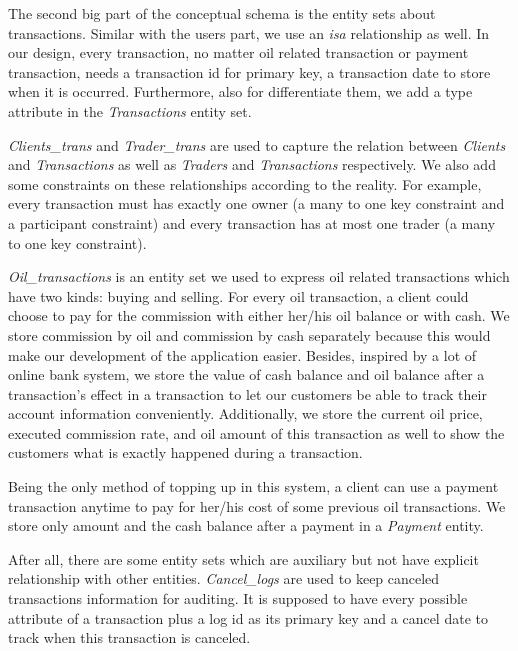 \documentclass[12pt,a4paper]{report}
\begin{document}
\begin{mypara}
  The second big part of the conceptual schema is the entity sets about transactions. Similar with the users part, we use an \textit{isa} relationship as well. In our design, every transaction, no matter oil related transaction or payment transaction, needs a transaction id for primary key, a transaction date to store when it is occurred. Furthermore, also for differentiate them, we add a type attribute in the \textit{Transactions} entity set.
  \par
  \textit{Clients\_trans} and \textit{Trader\_trans} are used to capture the relation between \textit{Clients} and \textit{Transactions} as well as \textit{Traders} and \textit{Transactions} respectively. We also add some constraints on these relationships according to the reality. For example, every transaction must has exactly one owner (a many to one key constraint and a participant constraint) and every transaction has at most one trader (a many to one key constraint).
  \par
  \textit{Oil\_transactions} is an entity set we used to express oil related transactions which have two kinds: buying and selling. For every oil transaction, a client could choose to pay for the commission with either her/his oil balance or with cash. We store commission by oil and commission by cash separately because this would make our development of the application easier. Besides, inspired by a lot of online bank system, we store the value of cash balance and oil balance after a transaction's effect in a transaction to let our customers be able to track their account information conveniently. Additionally, we store the current oil price, executed commission rate, and oil amount of this transaction as well to show the customers what is exactly happened during a transaction.
  \par
  Being the only method of topping up in this system, a client can use a payment transaction anytime to pay for her/his cost of some previous oil transactions. We store only amount and the cash balance after a payment in a \textit{Payment} entity.

  After all, there are some entity sets which are auxiliary but not have explicit relationship with other entities. \textit{Cancel\_logs} are used to keep canceled transactions information for auditing. It is supposed to have every possible attribute of a transaction plus a log id as its primary key and a cancel date to track when this transaction is canceled.
\end{mypara}
\end{document}
